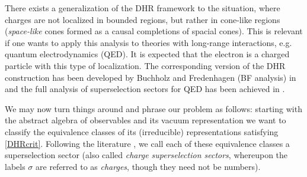 \documentclass[12pt,a4paper]{article}
\newcommand{\1}{\mathds{1}}                         %
\newcommand{\CC}{\mathbb{C}}           %
\newcommand{\Hcal}{\mathcal {H}}
\newcommand{\Ac}{{\mathcal{A}}}
\begin{document}
There exists a generalization of the DHR framework to the situation, where charges are not localized in bounded regions, but rather in cone-like regions (\emph{space-like} cones formed as a causal completions of spacial cones). This is relevant if one wants to apply this analysis to theories with long-range interactions, e.g. quantum electrodynamics (QED). It is expected that the electron is a charged particle with this type of localization. The corresponding version of the DHR construction has been developed by Buchholz and Fredenhagen (BF analysis) in \cite{BF82} and the full analysis of superselection sectors for QED has been achieved in \cite{BR14}.

We may now turn things around and phrase  our problem as follows: starting with the abstract algebra of observables and its vacuum representation we want to classify the equivalence classes of its (irreducible) representations satisfying \eqref{DHRcrit}. Following the literature \cite{Haag,DHR1,DHR2,DHR3,DHR4}, we call each of these equivalence classes a superselection sector (also called \textit{charge superselection sectors}, whereupon the labels $\sigma$ are referred to as \textit{charges}, though they need not be numbers). 
%
% 
 
\end{document}
